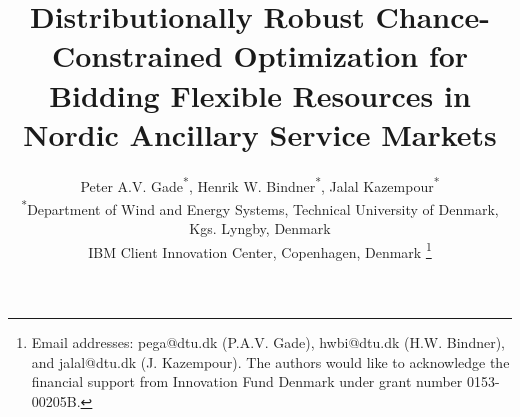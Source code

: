 \documentclass[conference]{IEEEtran}
\begin{document}
\title{Distributionally Robust Chance-Constrained Optimization for Bidding Flexible Resources in Nordic Ancillary Service Markets}

\author{Peter A.V. Gade\textsuperscript{*}\textsuperscript{\textdagger}, Henrik W. Bindner\textsuperscript{*}, Jalal Kazempour\textsuperscript{*} \\
    \textsuperscript{*}Department of Wind and Energy Systems, Technical University of Denmark, Kgs. Lyngby, Denmark \\
    \textsuperscript{\textdagger}IBM Client Innovation Center, Copenhagen, Denmark
    \thanks{
        Email addresses: pega@dtu.dk (P.A.V. Gade), hwbi@dtu.dk (H.W. Bindner), and jalal@dtu.dk (J. Kazempour). The authors would like to acknowledge the financial support from Innovation Fund Denmark under grant number 0153-00205B.}%
    \vspace{-3mm}
}




\maketitle

\end{document}
